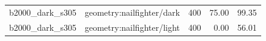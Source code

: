 \begin{longtable}{l>{\raggedright\arraybackslash}p{.42\linewidth}rrr}
b2000\_\allowbreak{}dark\_\allowbreak{}s305 & %
geometry:nailfighter/dark & %
400 & %
75.00 & %
99.35 \\ %

b2000\_\allowbreak{}dark\_\allowbreak{}s305 & %
geometry:nailfighter/light & %
400 & %
0.00 & %
56.01 \\ %


\end{longtable}
